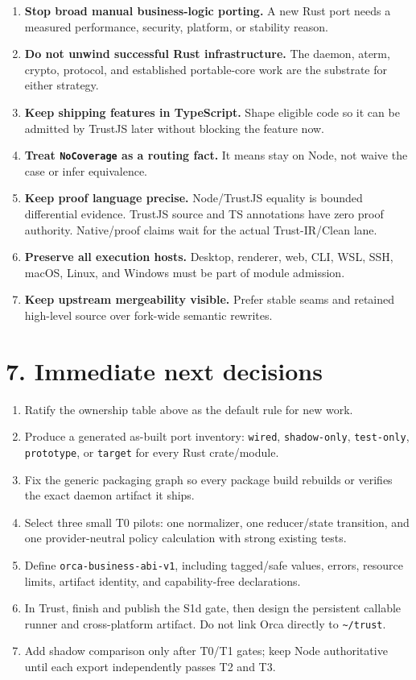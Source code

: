 \documentclass[
  10pt,
  letterpaper,
]{article}
\providecommand{\tightlist}{%
  \setlength{\itemsep}{0pt}\setlength{\parskip}{0pt}}
\begin{document}
\begin{enumerate}
\def\labelenumi{\arabic{enumi}.}
\tightlist
\item
  \textbf{Stop broad manual business-logic porting.} A new Rust port
  needs a measured performance, security, platform, or stability reason.
\item
  \textbf{Do not unwind successful Rust infrastructure.} The daemon,
  aterm, crypto, protocol, and established portable-core work are the
  substrate for either strategy.
\item
  \textbf{Keep shipping features in TypeScript.} Shape eligible code so
  it can be admitted by TrustJS later without blocking the feature now.
\item
  \textbf{Treat \texttt{NoCoverage} as a routing fact.} It means stay on
  Node, not waive the case or infer equivalence.
\item
  \textbf{Keep proof language precise.} Node/TrustJS equality is bounded
  differential evidence. TrustJS source and TS annotations have zero
  proof authority. Native/proof claims wait for the actual
  Trust-IR/Clean lane.
\item
  \textbf{Preserve all execution hosts.} Desktop, renderer, web, CLI,
  WSL, SSH, macOS, Linux, and Windows must be part of module admission.
\item
  \textbf{Keep upstream mergeability visible.} Prefer stable seams and
  retained high-level source over fork-wide semantic rewrites.
\end{enumerate}

\section{7. Immediate next decisions}\label{7-immediate-next-decisions}

\begin{enumerate}
\def\labelenumi{\arabic{enumi}.}
\tightlist
\item
  Ratify the ownership table above as the default rule for new work.
\item
  Produce a generated as-built port inventory: \texttt{wired},
  \texttt{shadow-only}, \texttt{test-only}, \texttt{prototype}, or
  \texttt{target} for every Rust crate/module.
\item
  Fix the generic packaging graph so every package build rebuilds or
  verifies the exact daemon artifact it ships.
\item
  Select three small T0 pilots: one normalizer, one reducer/state
  transition, and one provider-neutral policy calculation with strong
  existing tests.
\item
  Define \texttt{orca-business-abi-v1}, including tagged/safe values,
  errors, resource limits, artifact identity, and capability-free
  declarations.
\item
  In Trust, finish and publish the S1d gate, then design the persistent
  callable runner and cross-platform artifact. Do not link Orca directly
  to \texttt{\textasciitilde{}/trust}.
\item
  Add shadow comparison only after T0/T1 gates; keep Node authoritative
  until each export independently passes T2 and T3.
\end{enumerate}
\end{document}
